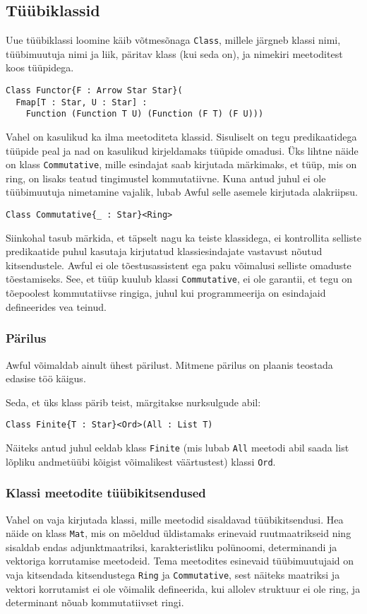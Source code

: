 \documentclass[12pt]{article}
\begin{document}
    \subsection{Tüübiklassid}
      Uue tüübiklassi loomine käib võtmesõnaga \verb!Class!, millele järgneb klassi nimi, tüübimuutuja nimi ja liik, päritav klass (kui seda on), ja nimekiri meetoditest koos tüüpidega.

      \begin{verbatim}Class Functor{F : Arrow Star Star}(
  Fmap[T : Star, U : Star] :
    Function (Function T U) (Function (F T) (F U)))\end{verbatim}

      Vahel on kasulikud ka ilma meetoditeta klassid. Sisuliselt on tegu predikaatidega tüüpide peal ja nad on kasulikud kirjeldamaks tüüpide omadusi. Üks lihtne näide on klass \verb!Commutative!, mille esindajat saab kirjutada märkimaks, et tüüp, mis on ring, on lisaks teatud tingimustel kommutatiivne. Kuna antud juhul ei ole tüübimuutuja nimetamine vajalik, lubab Awful selle asemele kirjutada alakriipsu.

      \begin{verbatim}Class Commutative{_ : Star}<Ring>\end{verbatim}

      Siinkohal tasub märkida, et täpselt nagu ka teiste klassidega, ei kontrollita selliste predikaatide puhul kasutaja kirjutatud klassiesindajate vastavust nõutud kitsendustele. Awful ei ole tõestusassistent ega paku võimalusi selliste omaduste tõestamiseks. See, et tüüp kuulub klassi \verb!Commutative!, ei ole garantii, et tegu on tõepoolest kommutatiivse ringiga, juhul kui programmeerija on esindajaid defineerides vea teinud.
      \subsubsection{Pärilus}
        Awful võimaldab ainult ühest pärilust. Mitmene pärilus on plaanis teostada edasise töö käigus.

        Seda, et üks klass pärib teist, märgitakse nurksulgude abil:

        \begin{verbatim}Class Finite{T : Star}<Ord>(All : List T)\end{verbatim}

        Näiteks antud juhul eeldab klass \verb!Finite! (mis lubab \verb!All! meetodi abil saada list lõpliku andmetüübi kõigist võimalikest väärtustest) klassi \verb!Ord!.
      \subsubsection{Klassi meetodite tüübikitsendused}
        Vahel on vaja kirjutada klassi, mille meetodid sisaldavad tüübikitsendusi. Hea näide on klass \verb!Mat!, mis on mõeldud üldistamaks erinevaid ruutmaatrikseid ning sisaldab endas adjunktmaatriksi, karakteristliku polünoomi, determinandi ja vektoriga korrutamise meetodeid. Tema meetodites esinevaid tüübimuutujaid on vaja kitsendada kitsendustega \verb!Ring! ja \verb!Commutative!, sest näiteks maatriksi ja vektori korrutamist ei ole võimalik defineerida, kui allolev struktuur ei ole ring, ja determinant nõuab kommutatiivset ringi.
\end{document}

